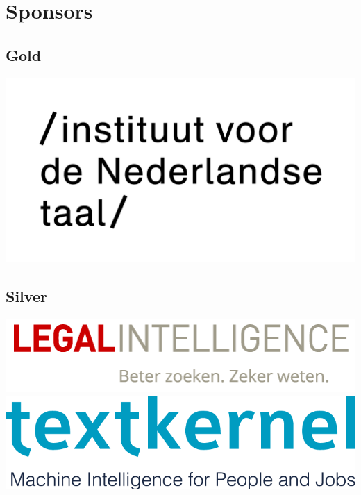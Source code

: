 \section{Sponsors}

\subsection{Gold}
\includegraphics{int-logo}

\subsection{Silver}
\includegraphics{LI_logo_RGB_tag}
\includegraphics{textkernel-tagline}

